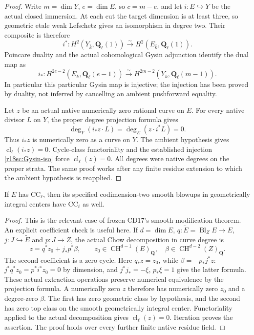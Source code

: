 \begin{proof}
Write $m=\dim Y$, $e=\dim E$, so $c=m-e$, and let
$i:E\hookrightarrow Y$ be the actual closed immersion.
At each cut the target dimension is at least three,
so geometric etale weak Lefschetz gives an isomorphism
in degree two.  Their composite is therefore
\[
 i^*:H^2(Y_{\bar k},\mathbf Q_\ell(1))
               \xrightarrow{\sim}H^2(E_{\bar k},\mathbf Q_\ell(1)).
 \tag{SC18.3}\label{r18sc:H2iso}
\]
Poincare duality and the actual cohomological Gysin
adjunction identify the dual map as
\[
 i_*:H^{2e-2}(E_{\bar k},\mathbf Q_\ell(e-1))
               \xrightarrow{\sim}
          H^{2m-2}(Y_{\bar k},\mathbf Q_\ell(m-1)).
 \tag{SC18.4}\label{r18sc:Gysin-iso}
\]
In particular this particular Gysin map is injective;
the injection has been proved by duality, not inferred
by cancelling an ambient pushforward equality.

Let $z$ be an actual native numerically zero rational
curve on $E$.  For every native divisor $L$ on $Y$,
the proper degree projection formula gives
\[
                  \deg_Y(i_*z\cdot L)=\deg_E(z\cdot i^*L)=0.
\]
Thus $i_*z$ is numerically zero as a curve on $Y$.
The ambient hypothesis gives
$\operatorname{cl}_\ell(i_*z)=0$.
Cycle-class functoriality and the established injection
\eqref{r18sc:Gysin-iso} force
$\operatorname{cl}_\ell(z)=0$.
All degrees were native degrees on the proper strata.
The same proof works after any finite residue extension
to which the ambient hypothesis is reapplied.
\end{proof}

\begin{lemma}
\label{r18sc:edge-blowups}
If $E$ has $\mathrm{CC}_\ell$, then its specified
codimension-two smooth blowups in geometrically
integral centers have $\mathrm{CC}_\ell$ as well.
\end{lemma}

\begin{proof}
This is the relevant case of frozen CD17's
smooth-modification theorem.  An explicit coefficient
check is useful here.  If $d=\dim E$,
$q:\widetilde E=\operatorname{Bl}_ZE\to E$,
$j:J\hookrightarrow\widetilde E$ and $p:J\to Z$,
the actual Chow decomposition in curve degree is
\[
 z=q^*z_0+j_*p^*\beta,
 \qquad z_0\in\operatorname{CH}^{d-1}(E)_{\mathbf Q},
 \quad\beta\in\operatorname{CH}^{d-2}(Z)_{\mathbf Q}.
 \tag{SC18.5}\label{r18sc:edge-decomposition}
\]
The second coefficient is a zero-cycle.
Here $q_*z=z_0$, while $\beta=-p_*j^*z$:
$j^*q^*z_0=p^*i^*z_0=0$ by dimension, and
$j^*j_*=-\xi$, $p_*\xi=1$ give the latter formula.
These actual extraction operations preserve numerical
equivalence by the projection formula.  A numerically
zero $z$ therefore has numerically zero $z_0$ and
a degree-zero $\beta$.  The first has zero geometric
class by hypothesis, and the second has zero top
class on the smooth geometrically integral center.
Functoriality applied to the actual decomposition
gives $\operatorname{cl}_\ell(z)=0$.
Iteration proves the assertion.  The proof holds
over every further finite native residue field.
\end{proof}

